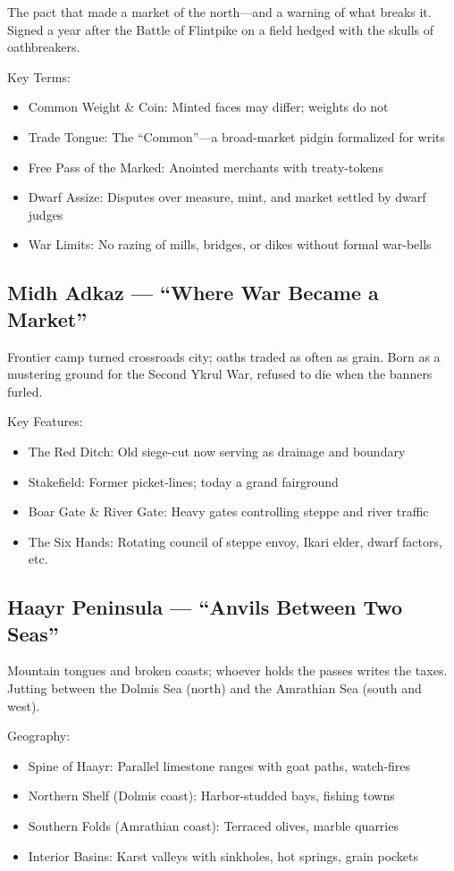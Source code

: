 The pact that made a market of the north---and a warning of what breaks it. Signed a year after the Battle of Flintpike on a field hedged with the skulls of oathbreakers.

Key Terms:
\begin{itemize}
    \item Common Weight \& Coin: Minted faces may differ; weights do not
    \item Trade Tongue: The ``Common''---a broad-market pidgin formalized for writs
    \item Free Pass of the Marked: Anointed merchants with treaty-tokens
    \item Dwarf Assize: Disputes over measure, mint, and market settled by dwarf judges
    \item War Limits: No razing of mills, bridges, or dikes without formal war-bells
\end{itemize}

\subsection{Midh Adkaz --- ``Where War Became a Market''}
\label{sec:midhadkaz}

Frontier camp turned crossroads city; oaths traded as often as grain. Born as a mustering ground for the Second Ykrul War, refused to die when the banners furled.

Key Features:
\begin{itemize}
    \item The Red Ditch: Old siege-cut now serving as drainage and boundary
    \item Stakefield: Former picket-lines; today a grand fairground
    \item Boar Gate \& River Gate: Heavy gates controlling steppe and river traffic
    \item The Six Hands: Rotating council of steppe envoy, Ikari elder, dwarf factors, etc.
\end{itemize}

\subsection{Haayr Peninsula --- ``Anvils Between Two Seas''}
\label{sec:haayr}

Mountain tongues and broken coasts; whoever holds the passes writes the taxes. Jutting between the Dolmis Sea (north) and the Amrathian Sea (south and west).

Geography:
\begin{itemize}
    \item Spine of Haayr: Parallel limestone ranges with goat paths, watch-fires
    \item Northern Shelf (Dolmis coast): Harbor-studded bays, fishing towns
    \item Southern Folds (Amrathian coast): Terraced olives, marble quarries
    \item Interior Basins: Karst valleys with sinkholes, hot springs, grain pockets
\end{itemize}

